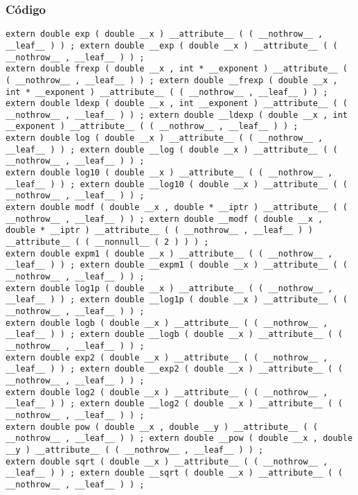 \documentclass{beamer}
\begin{document}
\begin{frame}[fragile]
\frametitle{C\'odigo}
\begin{verbatim}
extern double exp ( double __x ) __attribute__ ( ( __nothrow__ , __leaf__ ) ) ; extern double __exp ( double __x ) __attribute__ ( ( __nothrow__ , __leaf__ ) ) ; 
extern double frexp ( double __x , int * __exponent ) __attribute__ ( ( __nothrow__ , __leaf__ ) ) ; extern double __frexp ( double __x , int * __exponent ) __attribute__ ( ( __nothrow__ , __leaf__ ) ) ; 
extern double ldexp ( double __x , int __exponent ) __attribute__ ( ( __nothrow__ , __leaf__ ) ) ; extern double __ldexp ( double __x , int __exponent ) __attribute__ ( ( __nothrow__ , __leaf__ ) ) ; 
extern double log ( double __x ) __attribute__ ( ( __nothrow__ , __leaf__ ) ) ; extern double __log ( double __x ) __attribute__ ( ( __nothrow__ , __leaf__ ) ) ; 
extern double log10 ( double __x ) __attribute__ ( ( __nothrow__ , __leaf__ ) ) ; extern double __log10 ( double __x ) __attribute__ ( ( __nothrow__ , __leaf__ ) ) ; 
extern double modf ( double __x , double * __iptr ) __attribute__ ( ( __nothrow__ , __leaf__ ) ) ; extern double __modf ( double __x , double * __iptr ) __attribute__ ( ( __nothrow__ , __leaf__ ) ) __attribute__ ( ( __nonnull__ ( 2 ) ) ) ; 
extern double expm1 ( double __x ) __attribute__ ( ( __nothrow__ , __leaf__ ) ) ; extern double __expm1 ( double __x ) __attribute__ ( ( __nothrow__ , __leaf__ ) ) ; 
extern double log1p ( double __x ) __attribute__ ( ( __nothrow__ , __leaf__ ) ) ; extern double __log1p ( double __x ) __attribute__ ( ( __nothrow__ , __leaf__ ) ) ; 
extern double logb ( double __x ) __attribute__ ( ( __nothrow__ , __leaf__ ) ) ; extern double __logb ( double __x ) __attribute__ ( ( __nothrow__ , __leaf__ ) ) ; 
extern double exp2 ( double __x ) __attribute__ ( ( __nothrow__ , __leaf__ ) ) ; extern double __exp2 ( double __x ) __attribute__ ( ( __nothrow__ , __leaf__ ) ) ; 
extern double log2 ( double __x ) __attribute__ ( ( __nothrow__ , __leaf__ ) ) ; extern double __log2 ( double __x ) __attribute__ ( ( __nothrow__ , __leaf__ ) ) ; 
extern double pow ( double __x , double __y ) __attribute__ ( ( __nothrow__ , __leaf__ ) ) ; extern double __pow ( double __x , double __y ) __attribute__ ( ( __nothrow__ , __leaf__ ) ) ; 
extern double sqrt ( double __x ) __attribute__ ( ( __nothrow__ , __leaf__ ) ) ; extern double __sqrt ( double __x ) __attribute__ ( ( __nothrow__ , __leaf__ ) ) ; 
\end{verbatim}
\end{frame}
\end{document}
